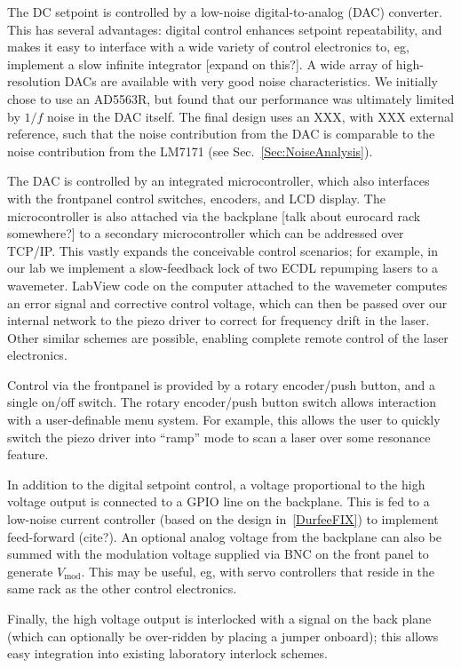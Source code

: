 \documentclass[aip,rsi,reprint]{revtex4-1} %
\begin{document}
The DC setpoint is controlled by a low-noise digital-to-analog (DAC) converter.
This has several advantages: digital control enhances setpoint repeatability, and makes it easy to interface with a wide variety of control electronics to, eg, implement a slow infinite integrator [expand on this?].
A wide array of high-resolution DACs are available with very good noise characteristics.
We initially chose to use an AD5563R, but found that our performance was ultimately limited by $1/f$ noise in the DAC itself.
The final design uses an XXX, with XXX external reference, such that the noise contribution from the DAC is comparable to the noise contribution from the LM7171 (see Sec.~\ref{Sec:NoiseAnalysis}).

The DAC is controlled by an integrated microcontroller, which also interfaces with the frontpanel control switches, encoders, and LCD display.
The microcontroller is also attached via the backplane [talk about eurocard rack somewhere?] to a secondary microcontroller which can be addressed over TCP/IP.
This vastly expands the conceivable control scenarios; for example, in our lab we implement a slow-feedback lock of two ECDL repumping lasers to a wavemeter.
LabView code on the computer attached to the wavemeter computes an error signal and corrective control voltage, which can then be passed over our internal network to the piezo driver to correct for frequency drift in the laser.
Other similar schemes are possible, enabling complete remote control of the laser electronics.

Control via the frontpanel is provided by a rotary encoder/push button, and a single on/off switch.
The rotary encoder/push button switch allows interaction with a user-definable menu system.
For example, this allows the user to quickly switch the piezo driver into ``ramp'' mode to scan a laser over some resonance feature.

In addition to the digital setpoint control, a voltage proportional to the high voltage output is connected to a GPIO line on the backplane.
This is fed to a low-noise current controller (based on the design in~\ref{DurfeeFIX}) to implement feed-forward (cite?).
An optional analog voltage from the backplane can also be summed with the modulation voltage supplied via BNC on the front panel to generate $V_{\text{mod}}$.
This may be useful, eg, with servo controllers that reside in the same rack as the other control electronics.

Finally, the high voltage output is interlocked with a signal on the back plane (which can optionally be over-ridden by placing a jumper onboard); this allows easy integration into existing laboratory interlock schemes.
\end{document}
